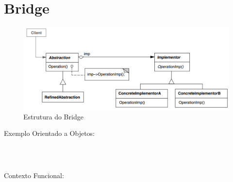\section{Bridge}

\begin{figure}[htb]
	\caption{\label{bridge_struct}Estrutura do Bridge}
	\begin{center}
	    \includegraphics[scale=0.4]{5_padroes-contexto-funcional/5.2_estruturais/5.2.2_bridge/diagram.png}
	\end{center}
\end{figure}

Exemplo Orientado a Objetos:

\begin{lstlisting}[caption={Bridge Orientado a Objetos},label=oobridge]



\end{lstlisting}

Contexto Funcional:


\begin{lstlisting}[caption={Bridge Funcional},label=fpbridge]
    

    
\end{lstlisting}